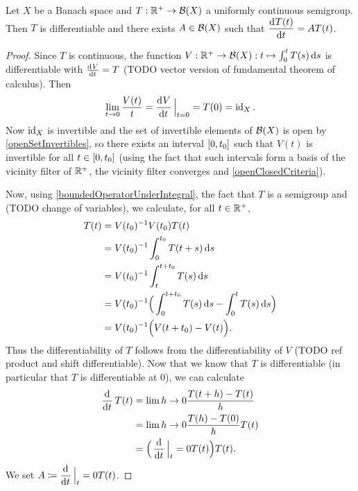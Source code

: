 \begin{proposition}
Let $X$ be a Banach space and $T: \mathbb{R}^+\to \operatorname{\mathcal{B}}(X)$ a uniformly continuous semigroup. Then $T$ is differentiable and there exists $A\in \operatorname{\mathcal{B}}(X)$ such that $\mathinner{ \dfrac{\operatorname{d \!}{^{}}T(t)}{\operatorname{d \!}{{t}^{}}} } = AT(t)$.
\end{proposition}
\begin{proof}
Since $T$ is continuous, the function $V: \mathbb{R}^+ \to \operatorname{\mathcal{B}}(X): t\mapsto \int_0^t T(s)\operatorname{d \!}{s}$ is differentiable with $\od{V}{t} = T$ (TODO vector version of fundamental theorem of calculus). Then
\[ \lim_{t\to 0}\frac{V(t)}{t} = \mathinner{ \dfrac{\operatorname{d \!}{^{}}V}{\operatorname{d \!}{{t}^{}}} }\Big|_{t=0} = T(0) = \operatorname{id}_X. \]
Now $\operatorname{id}_X$ is invertible and the set of invertible elements of $\operatorname{\mathcal{B}}(X)$ is open by \ref{openSetInvertibles}, so there exists an interval $\interval{0,t_0}$ such that $V(t)$ is invertible for all $t\in \interval{0,t_0}$ (using the fact that such intervals form a basis of the vicinity filter of $\mathbb{R}^+$, the vicinity filter converges and \ref{openClosedCriteria}).

Now, using \ref{boundedOperatorUnderIntegral}, the fact that $T$ is a semigroup and (TODO change of variables), we calculate, for all $t\in \mathbb{R}^+$,
\begin{align*}
T(t) &= V(t_0)^{-1}V(t_0)T(t) \\
&= V(t_0)^{-1}\int_0^{t_0}T(t+s)\operatorname{d \!}{s} \\
&= V(t_0)^{-1}\int_t^{t+t_0}T(s)\operatorname{d \!}{s} \\
&= V(t_0)^{-1}\Big(\int_0^{t+t_0}T(s)\operatorname{d \!}{s} - \int_0^{t}T(s)\operatorname{d \!}{s}\Big) \\
&= V(t_0)^{-1}\Big(V(t+t_0) - V(t)\Big).
\end{align*}
Thus the differentiability of $T$ follows from the differentiability of $V$ (TODO ref product and shift differentiable). Now that we know that $T$ is differentiable (in particular that $T$ is differentiable at $0$), we can calculate
\begin{align*}
\mathinner{ \dfrac{\operatorname{d \!}{^{}}}{\operatorname{d \!}{{t}^{}}} }T(t) &= \lim{h\to 0} \frac{T(t+h) - T(t)}{h} \\
&= \lim{h\to 0} \frac{T(h) - T(0)}{h}T(t) \\
&= \Big(\mathinner{ \dfrac{\operatorname{d \!}{^{}}}{\operatorname{d \!}{{t}^{}}} }\Big|_t=0 T(t)\Big)T(t).
\end{align*}
We set $A\coloneqq \mathinner{ \dfrac{\operatorname{d \!}{^{}}}{\operatorname{d \!}{{t}^{}}} }\Big|_t=0 T(t)$.
\end{proof}

